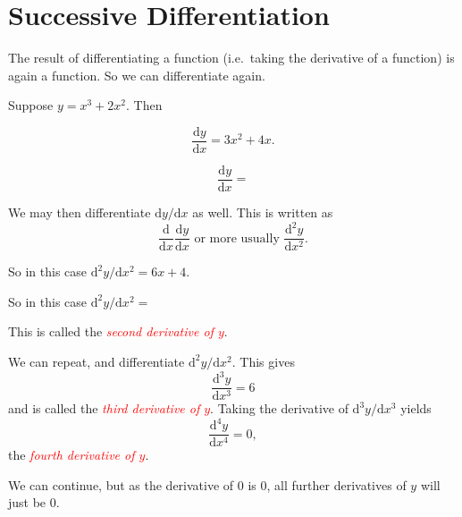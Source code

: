 \documentclass[
  11pt,
  oneside]{book}
\newcommand{\slide}{}
\theoremstyle{definition}
\theoremstyle{definition}
\theoremstyle{definition}
\theoremstyle{definition}
\theoremstyle{remark}
\begin{document}
\section{Successive Differentiation}\label{lecture-seven}

The result of differentiating a function (i.e.~taking the derivative of a function) is again a function. So we can differentiate again.

Suppose \(y = x^3 + 2x^2\). Then

\begin{notslides}

\[
\frac{\mathrm{d} y}{\mathrm{d} x} = 3x^2 + 4x.
\]

\end{notslides}

\begin{slidesonly}

\[
\frac{\mathrm{d} y}{\mathrm{d} x} = 
\]

\end{slidesonly}

We may then differentiate \(\mathrm{d}y/\mathrm{d} x\) as well. This is written as
\[
\frac{\mathrm{d}}{\mathrm{d} x}\frac{\mathrm{d} y}{\mathrm{d} x}\text{ or more usually }\frac{\mathrm{d}^{2}y}{\mathrm{d} x^2}.
\]

\begin{notslides}

So in this case \(\mathrm{d}^{2}y/\mathrm{d} x^2 = 6x+4\).

\end{notslides}

\begin{slidesonly}

So in this case \(\mathrm{d}^{2}y/\mathrm{d} x^2 =\)

\end{slidesonly}

This is called the \textcolor{red}{\em second derivative of $y$}.

\slide

We can repeat, and differentiate \(\mathrm{d}^{2}y/\mathrm{d} x^2\). This gives
\[
\frac{\mathrm{d}^{3}y}{\mathrm{d} x^{3}} = 6
\]
and is called the \textcolor{red}{\em third derivative of $y$}. Taking the derivative of \(\mathrm{d}^{3}y/\mathrm{d} x^{3}\) yields
\[
\frac{\mathrm{d}^{4}y}{\mathrm{d} x^{4}} = 0,
\]
the \textcolor{red}{\em fourth derivative of $y$}.

We can continue, but as the derivative of \(0\) is \(0\), all further derivatives of \(y\) will just be \(0\).
\slide
\end{document}
